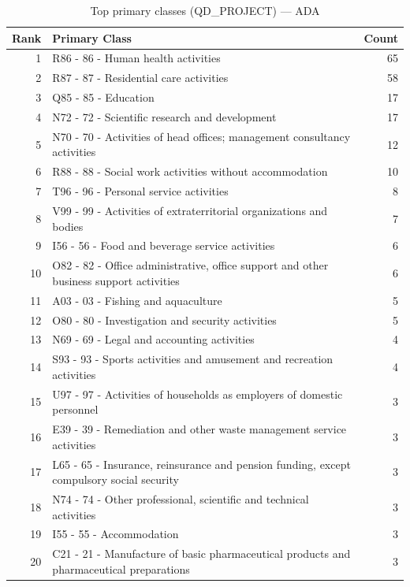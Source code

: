 \begin{table}[H]
    \centering
    \begin{tabular}{r p{10cm} r}
    \hline
    \textbf{Rank} & \textbf{Primary Class} & \textbf{Count} \\
    \hline
    1 & R86 - 86 - Human health activities & 65 \\
    2 & R87 - 87 - Residential care activities & 58 \\
    3 & Q85 - 85 - Education & 17 \\
    4 & N72 - 72 - Scientific research and development & 17 \\
    5 & N70 - 70 - Activities of head offices; management consultancy activities & 12 \\
    6 & R88 - 88 - Social work activities without accommodation & 10 \\
    7 & T96 - 96 - Personal service activities & 8 \\
    8 & V99 - 99 - Activities of extraterritorial organizations and bodies & 7 \\
    9 & I56 - 56 - Food and beverage service activities & 6 \\
    10 & O82 - 82 - Office administrative, office support and other business support activities & 6 \\
    11 & A03 - 03 - Fishing and aquaculture & 5 \\
    12 & O80 - 80 - Investigation and security activities & 5 \\
    13 & N69 - 69 - Legal and accounting activities & 4 \\
    14 & S93 - 93 - Sports activities and amusement and recreation activities & 4 \\
    15 & U97 - 97 - Activities of households as employers of domestic personnel & 3 \\
    16 & E39 - 39 - Remediation and other waste management service activities & 3 \\
    17 & L65 - 65 - Insurance, reinsurance and pension funding, except compulsory social security & 3 \\
    18 & N74 - 74 - Other professional, scientific and technical activities & 3 \\
    19 & I55 - 55 - Accommodation & 3 \\
    20 & C21 - 21 - Manufacture of basic pharmaceutical products and pharmaceutical preparations & 3 \\
    \hline
    \end{tabular}
    \caption{Top primary classes (QD\_PROJECT) --- ADA}
\end{table}


